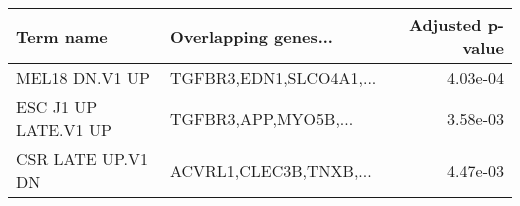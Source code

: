 \begin{tabular}{llr}
\toprule
           Term name &    Overlapping genes... &  Adjusted p-value \\
\midrule
      MEL18 DN.V1 UP & TGFBR3,EDN1,SLCO4A1,... &          4.03e-04 \\
ESC J1 UP LATE.V1 UP &    TGFBR3,APP,MYO5B,... &          3.58e-03 \\
   CSR LATE UP.V1 DN &  ACVRL1,CLEC3B,TNXB,... &          4.47e-03 \\
\bottomrule
\end{tabular}
